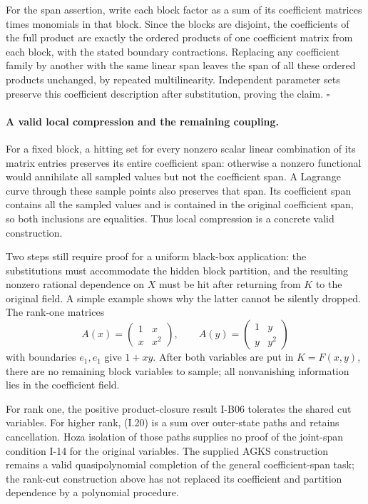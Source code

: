 For the span assertion, write each block factor as a sum of its
coefficient matrices times monomials in that block.  Since the
blocks are disjoint, the coefficients of the full product are
exactly the ordered products of one coefficient matrix from each
block, with the stated boundary contractions.  Replacing any
coefficient family by another with the same linear span leaves
the span of all these ordered products unchanged, by repeated
multilinearity.  Independent parameter sets preserve this coefficient
description after substitution, proving the claim.
\hfill$\square$

\paragraph{A valid local compression and the remaining coupling.}
For a fixed block, a hitting set for every nonzero scalar linear
combination of its matrix entries preserves its entire coefficient
span: otherwise a nonzero functional would annihilate all sampled
values but not the coefficient span.  A Lagrange curve through
these sample points also preserves that span.  Its coefficient
span contains all the sampled values and is contained in the
original coefficient span, so both inclusions are equalities.
Thus local compression is a concrete valid construction.

Two steps still require proof for a uniform black-box application:
the substitutions must accommodate the hidden block partition, and
the resulting nonzero rational dependence on $X$ must be hit after
returning from $K$ to the original field.  A simple example shows
why the latter cannot be silently dropped.  The rank-one matrices
\[
 A(x)=\begin{pmatrix}1&x\\x&x^2\end{pmatrix},\qquad
 A(y)=\begin{pmatrix}1&y\\y&y^2\end{pmatrix}
\]
with boundaries $e_1,e_1$ give $1+xy$.  After both variables are
put in $K=F(x,y)$, there are no remaining block variables to sample;
all nonvanishing information lies in the coefficient field.

For rank one, the positive product-closure result I-B06 tolerates
the shared cut variables.  For higher rank, (I.20) is a sum over
outer-state paths and retains cancellation.  Hoza isolation of
those paths supplies no proof of the joint-span condition I-14
for the original variables.  The supplied AGKS construction remains
a valid quasipolynomial completion of the general coefficient-span
task; the rank-cut construction above has not replaced its
coefficient and partition dependence by a polynomial procedure.

